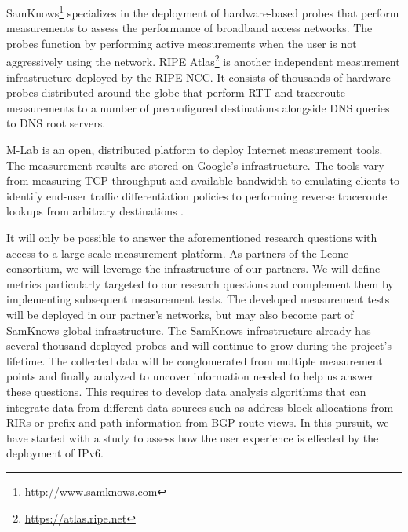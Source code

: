 SamKnows\footnote{\url{http://www.samknows.com}} specializes in the deployment
of hardware-based probes that perform measurements to assess the performance
of broadband access networks. The probes function by performing active
measurements when the user is not aggressively using the network.  RIPE
Atlas\footnote{\url{https://atlas.ripe.net}} is another independent
measurement infrastructure deployed by the \ac{RIPE NCC}. It consists of
thousands of hardware probes distributed around the globe that perform
\ac{RTT} and traceroute measurements to a number of preconfigured destinations
alongside DNS queries to DNS root servers.

\ac{M-Lab} \cite{dovrolis:2010} is an open, distributed platform to deploy
Internet measurement tools. The measurement results are stored on Google's
infrastructure. The tools vary from measuring TCP throughput and available
bandwidth to emulating clients to identify end-user traffic differentiation
policies \cite{dischinger:2010, kanuparthy:2011} to performing reverse
traceroute lookups from arbitrary destinations \cite{bassett:2010}.

It will only be possible to answer the aforementioned research questions with
access to a large-scale measurement platform. As partners of the Leone
consortium, we will leverage the infrastructure of our partners. We will
define metrics particularly targeted to our research questions and complement
them by implementing subsequent measurement tests. The developed measurement
tests will be deployed in our partner's networks, but may also become part of
SamKnows global infrastructure. The SamKnows infrastructure already has
several thousand deployed probes and will continue to grow during the
project's lifetime. The collected data will be conglomerated from multiple
measurement points and finally analyzed to uncover information needed to help
us answer these questions. This requires to develop data analysis algorithms
that can integrate data from different data sources such as address block
allocations from \ac{RIR}s or prefix and path information from BGP route
views. In this pursuit, we have started with a study to assess how the user
experience is effected by the deployment of IPv6.
